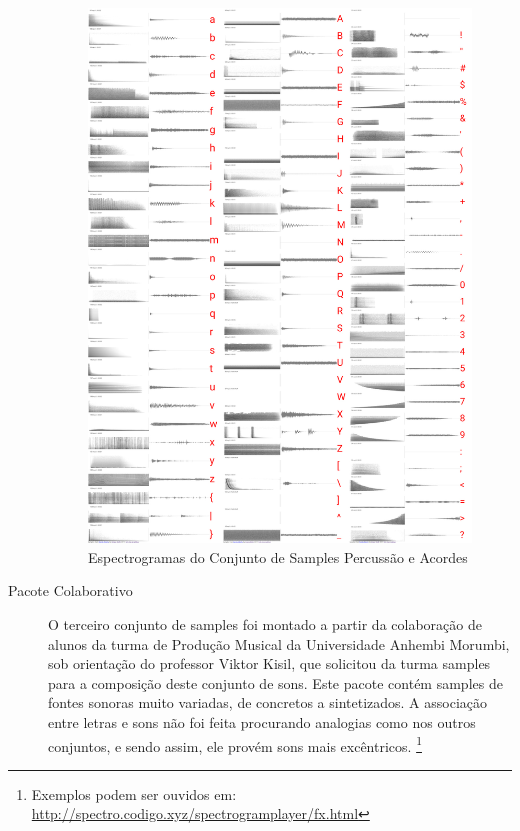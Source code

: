 \begin{description}
\begin{figure}[htb]
    \caption{\label{samplespercussao}Espectrogramas do Conjunto de Samples Percussão e Acordes}
    \begin{center}
        \includegraphics[width=0.7\linewidth]{pictures/cap3/bandapercussao.jpg}
    \end{center}
\end{figure}

\item[Pacote Colaborativo]O terceiro conjunto de samples foi montado a partir da colaboração de alunos da turma de Produção Musical da Universidade Anhembi Morumbi, sob orientação do professor Viktor Kisil, que solicitou da turma samples para a composição deste conjunto de sons. Este pacote contém samples de fontes sonoras muito variadas, de concretos a sintetizados. A associação entre letras e sons não foi feita procurando analogias como nos outros conjuntos, e sendo assim, ele provém sons mais excêntricos. \footnote{Exemplos podem ser ouvidos em: \url{http://spectro.codigo.xyz/spectrogramplayer/fx.html}} 


\end{description}
